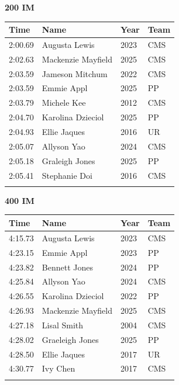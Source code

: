\vspace{1.2em}
\noindent\begin{minipage}[t]{0.98\textwidth}
\centering
\textbf{\textcolor{teamprimary}{200 IM}}\par
\vspace{0.5em}
\centering
\small
\renewcommand{\arraystretch}{1.0}
\setlength{\tabcolsep}{4pt}
\begin{tabular}{@{}p{2.5cm}p{4.5cm}p{1.5cm}p{2.5cm}@{}}
\toprule
\textbf{Time} & \textbf{Name} & \textbf{Year} & \textbf{Team} \\
\midrule
2:00.69 & Augusta Lewis & 2023 & CMS \\
2:02.63 & Mackenzie Mayfield & 2025 & CMS \\
2:03.59 & Jameson Mitchum & 2022 & CMS \\
2:03.59 & Emmie Appl & 2025 & PP \\
2:03.79 & Michele Kee & 2012 & CMS \\
2:04.70 & Karolina Dzieciol & 2025 & PP \\
2:04.93 & Ellie Jaques & 2016 & UR \\
2:05.07 & Allyson Yao & 2024 & CMS \\
2:05.18 & Graleigh Jones & 2025 & PP \\
2:05.41 & Stephanie Doi & 2016 & CMS \\
\bottomrule
\vspace{0.5em}
\end{tabular}
\end{minipage}
\vspace{1.2em}
\noindent\begin{minipage}[t]{0.98\textwidth}
\centering
\textbf{\textcolor{teamprimary}{400 IM}}\par
\vspace{0.5em}
\centering
\small
\renewcommand{\arraystretch}{1.0}
\setlength{\tabcolsep}{4pt}
\begin{tabular}{@{}p{2.5cm}p{4.5cm}p{1.5cm}p{2.5cm}@{}}
\toprule
\textbf{Time} & \textbf{Name} & \textbf{Year} & \textbf{Team} \\
\midrule
4:15.73 & Augusta Lewis & 2023 & CMS \\
4:23.15 & Emmie Appl & 2023 & PP \\
4:23.82 & Bennett Jones & 2024 & PP \\
4:25.84 & Allyson Yao & 2024 & CMS \\
4:26.55 & Karolina Dzieciol & 2022 & PP \\
4:26.93 & Mackenzie Mayfield & 2025 & CMS \\
4:27.18 & Lisal Smith & 2004 & CMS \\
4:28.02 & Graeleigh Jones & 2025 & PP \\
4:28.50 & Ellie Jaques & 2017 & UR \\
4:30.77 & Ivy Chen & 2017 & CMS \\
\bottomrule
\vspace{0.5em}
\end{tabular}
\end{minipage}
